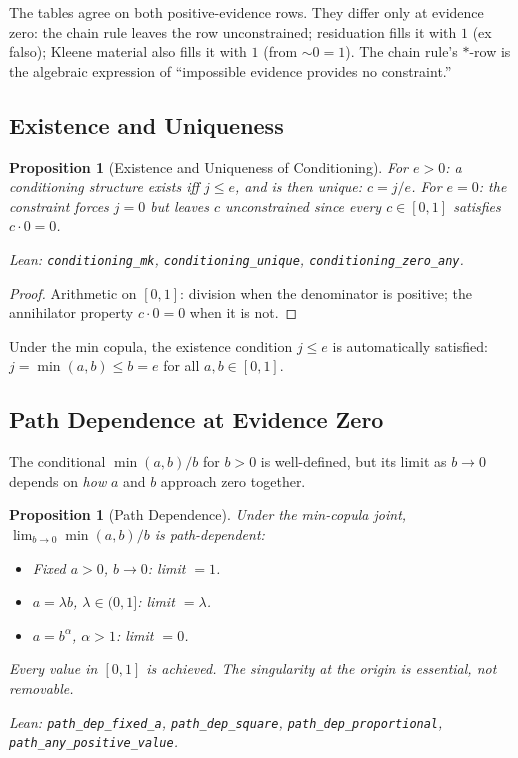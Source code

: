 \documentclass[11pt,a4paper]{article}
\newtheorem{proposition}[theorem]{Proposition}
\newcommand{\negc}{\mathord{\sim}}
\begin{document}
The tables agree on both positive-evidence rows.
They differ only at evidence zero: the chain rule leaves the row
unconstrained; residuation fills it with $1$ (ex falso);
Kleene material also fills it with $1$ (from $\negc 0 = 1$).
The chain rule's $*$-row is the algebraic expression of
``impossible evidence provides no constraint.''

\subsection{Existence and Uniqueness}

\begin{proposition}[Existence and Uniqueness of Conditioning]
\label{prop:conditioning}
For $e > 0$: a conditioning structure exists iff
$j \leq e$, and is then unique: $c = j / e$.
For $e = 0$: the constraint forces
$j = 0$ but leaves $c$ unconstrained
since every $c \in [0,1]$ satisfies $c \cdot 0 = 0$.

Lean: \texttt{conditioning\_mk},
\texttt{conditioning\_unique},
\texttt{conditioning\_zero\_any}.
\end{proposition}

\begin{proof}
Arithmetic on $[0,1]$: division when the denominator is positive;
the annihilator property $c \cdot 0 = 0$ when it is not.
\end{proof}

Under the min copula, the existence condition $j \leq e$ is
automatically satisfied: $j = \min(a, b) \leq b = e$ for all
$a, b \in [0,1]$.

\subsection{Path Dependence at Evidence Zero}

The conditional $\min(a,b)/b$ for $b > 0$ is well-defined, but
its limit as $b \to 0$ depends on \emph{how} $a$ and $b$ approach
zero together.

\begin{proposition}[Path Dependence]
\label{prop:path-dep}
Under the min-copula joint, $\lim_{b \to 0} \min(a,b)/b$ is
path-dependent:
\begin{itemize}[nosep]
\item Fixed $a > 0$, $b \to 0$: limit $= 1$.
\item $a = \lambda b$, $\lambda \in (0,1]$: limit $= \lambda$.
\item $a = b^\alpha$, $\alpha > 1$: limit $= 0$.
\end{itemize}
Every value in $[0,1]$ is achieved.
The singularity at the origin is essential, not removable.

Lean: \texttt{path\_dep\_fixed\_a}, \texttt{path\_dep\_square},
\texttt{path\_dep\_\linebreak proportional},
\texttt{path\_any\_positive\_value}.
\end{proposition}
\end{document}
